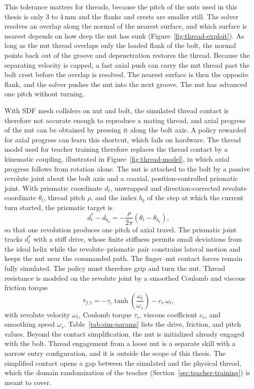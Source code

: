 This tolerance matters for threads, because the pitch of the nuts used in this thesis is only 3 to 4\,mm and the flanks and crests are smaller still. The solver resolves an overlap along the normal of the nearest surface, and which surface is nearest depends on how deep the nut has sunk (Figure~\ref{fig:thread-exploit}). As long as the nut thread overlaps only the loaded flank of the bolt, the normal points back out of the groove and depenetration restores the thread. Because the separating velocity is capped, a fast axial push can carry the nut thread past the bolt crest before the overlap is resolved. The nearest surface is then the opposite flank, and the solver pushes the nut into the next groove. The nut has advanced one pitch without turning.

With \ac{SDF} mesh colliders on nut and bolt, the simulated thread contact is therefore not accurate enough to reproduce a mating thread, and axial progress of the nut can be obtained by pressing it along the bolt axis. A policy rewarded for axial progress can learn this shortcut, which fails on hardware. The thread model used for teacher training therefore replaces the thread contact by a kinematic coupling, illustrated in Figure~\ref{fig:thread-model}, in which axial progress follows from rotation alone. The nut is attached to the bolt by a passive revolute joint about the bolt axis and a coaxial, position-controlled prismatic joint. With prismatic coordinate $d_t$, unwrapped and direction-corrected revolute coordinate $\theta_t$, thread pitch $\rho$, and the index $b_k$ of the step at which the current turn started, the prismatic target is
\begin{equation}\label{eq:thread}
  d^{*}_t-d_{b_k}=-\frac{\rho}{2\pi}\left(\theta_t-\theta_{b_k}\right),
\end{equation}
so that one revolution produces one pitch of axial travel. The prismatic joint tracks $d^{*}_t$ with a stiff drive, whose finite stiffness permits small deviations from the ideal helix while the revolute--prismatic pair constrains lateral motion and keeps the nut near the commanded path. The finger--nut contact forces remain fully simulated. The policy must therefore grip and turn the nut. Thread resistance is modeled on the revolute joint by a smoothed Coulomb and viscous friction torque
\begin{equation}\label{eq:friction}
  \bar{\tau}_{f,t}=-\tau_c\tanh\!\left(\frac{\omega_t}{\omega_s}\right)-c_v\,\omega_t,
\end{equation}
with revolute velocity $\omega_t$, Coulomb torque $\tau_c$, viscous coefficient $c_v$, and smoothing speed $\omega_s$. Table~\ref{tab:sim-params} lists the drive, friction, and pitch values. Beyond the contact simplification, the nut is initialized already engaged with the bolt. Thread engagement from a loose nut is a separate skill with a narrow entry configuration, and it is outside the scope of this thesis. The simplified contact opens a gap between the simulated and the physical thread, which the domain randomization of the teacher (Section~\ref{sec:teacher-training}) is meant to cover.

